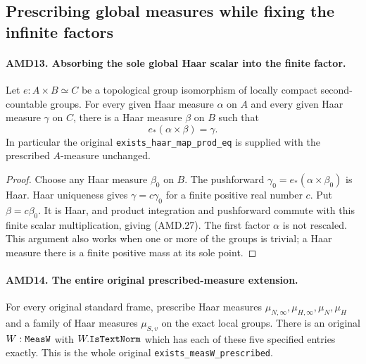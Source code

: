 \documentclass[11pt,a4paper]{article}
\numberwithin{equation}{section}
\theoremstyle{remark}\newtheorem{remark}[theorem]{Remark}
\begin{document}
\subsection{Prescribing global measures while fixing the infinite factors}

\paragraph{AMD13. Absorbing the sole global Haar scalar into the finite factor.}
\label{claim:AMD13}
Let \(e:A\times B\simeq C\) be a topological group
isomorphism of locally compact second-countable groups.  For
every given Haar measure \(\alpha\) on \(A\) and every
given Haar measure \(\gamma\) on \(C\), there is a Haar
measure \(\beta\) on \(B\) such that
\[
                       e_*(\alpha\times\beta)=\gamma.
 \tag{AMD.27}
\]
In particular the original \texttt{exists\_\allowbreak haar\_\allowbreak map\_\allowbreak prod\_\allowbreak eq}
is supplied with the prescribed \(A\)-measure unchanged.

\begin{proof}
Choose any Haar measure \(\beta_0\) on \(B\).  The
pushforward \(\gamma_0=e_*(\alpha\times\beta_0)\) is Haar.
Haar uniqueness gives \(\gamma=c\gamma_0\) for a finite
positive real number \(c\).  Put \(\beta=c\beta_0\).
It is Haar, and product integration and pushforward commute
with this finite scalar multiplication, giving (AMD.27).
The first factor \(\alpha\) is not rescaled.  This argument
also works when one or more of the groups is trivial; a Haar
measure there is a finite positive mass at its sole point.
\end{proof}

\paragraph{AMD14. The entire original prescribed-measure extension.}
\label{claim:AMD14}
For every original standard frame, prescribe Haar measures
\(\mu_{N,\infty},\mu_{H,\infty},\mu_N,\mu_H\) and a
family of Haar measures \(\mu_{S,v}\) on the exact local
groups.  There is an original \(W:\texttt{Meas\allowbreak W}\) with
\(W.\texttt{Is\allowbreak Text\allowbreak Norm}\) which has each of these five
specified entries exactly.  This is the whole original
\texttt{exists\_\allowbreak meas\allowbreak W\_\allowbreak prescribed}.
\end{document}
